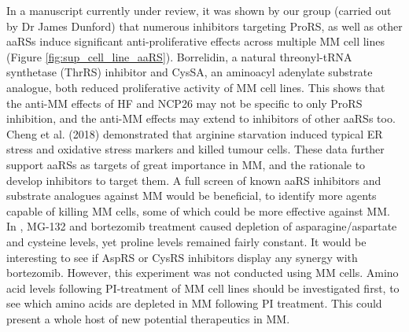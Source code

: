 In a manuscript currently under review, it was shown by our group (carried out by Dr James Dunford) that numerous inhibitors targeting ProRS, as well as other aaRSs induce significant anti-proliferative effects across multiple MM cell lines (Figure \ref{fig:sup_cell_line_aaRS})\cite{bottpreclinical2022}.
Borrelidin, a natural threonyl-tRNA synthetase (ThrRS) inhibitor and CysSA, an aminoacyl adenylate substrate analogue, both reduced proliferative activity of MM cell lines.
This shows that the anti-MM effects of HF and NCP26 may not be specific to only ProRS inhibition, and the anti-MM effects may extend to inhibitors of other aaRSs too.
Cheng et al. (2018) demonstrated that arginine starvation induced typical ER stress and oxidative stress markers and killed tumour cells\cite{cheng2018arginine}.
These data further support aaRSs as targets of great importance in MM, and the rationale to develop inhibitors to target them.
A full screen of known aaRS inhibitors and substrate analogues against MM would be beneficial, to identify more agents capable of killing MM cells, some of which could be more effective against MM\@.
In \cite{suraweera2012failure}, MG-132 and bortezomib treatment caused depletion of asparagine/aspartate and cysteine levels, yet proline levels remained fairly constant.
It would be interesting to see if AspRS or CysRS inhibitors display any synergy with bortezomib.
However, this experiment was not conducted using MM cells.
Amino acid levels following PI-treatment of MM cell lines should be investigated first, to see which amino acids are depleted in MM following PI treatment.
This could present a whole host of new potential therapeutics in MM\@.






